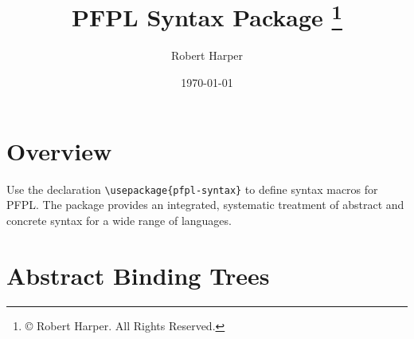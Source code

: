 \documentclass[11pt]{article}
\title{\textsf{PFPL} Syntax Package%
\footnote{\copyright{} \the\year{} Robert Harper.  All Rights Reserved.}}
\author{Robert Harper}
\date{\today}
\begin{document}
\maketitle{}

\section*{Overview\footnotemark}

Use the declaration \verb|\usepackage{pfpl-syntax}| to define syntax macros for \textsf{PFPL}.  The package provides an integrated, systematic treatment of abstract and concrete syntax for a wide range of languages.


\section*{Abstract Binding Trees}
\end{document}

